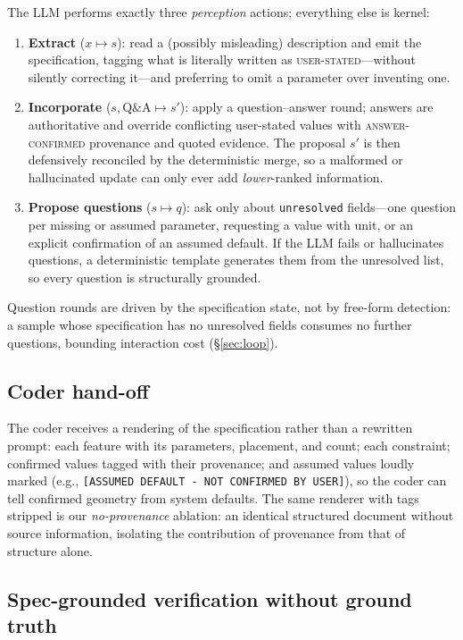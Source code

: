 The LLM performs exactly three \emph{perception} actions; everything else is
kernel:
\begin{enumerate}
  \item \textbf{Extract} ($x \mapsto s$): read a (possibly misleading)
  description and emit the specification, tagging what is literally written as
  \textsc{user-stated}---without silently correcting it---and preferring to
  omit a parameter over inventing one.
  \item \textbf{Incorporate} ($s, \mathrm{Q\&A} \mapsto s'$): apply a
  question--answer round; answers are authoritative and override conflicting
  user-stated values with \textsc{answer-confirmed} provenance and quoted
  evidence. The proposal $s'$ is then defensively reconciled by the
  deterministic merge, so a malformed or hallucinated update can only ever
  add \emph{lower}-ranked information.
  \item \textbf{Propose questions} ($s \mapsto q$): ask only about
  \texttt{unresolved} fields---one question per missing or assumed
  parameter, requesting a value with unit, or an explicit confirmation of an
  assumed default. If the LLM fails or hallucinates questions, a
  deterministic template generates them from the unresolved list, so every
  question is structurally grounded.
\end{enumerate}
Question rounds are driven by the specification state, not by free-form
detection: a sample whose specification has no unresolved fields consumes no
further questions, bounding interaction cost (\S\ref{sec:loop}).

\subsection{Coder hand-off}\label{sec:handoff}

The coder receives a rendering of the specification rather than a rewritten
prompt: each feature with its parameters, placement, and count; each
constraint; confirmed values tagged with their provenance; and assumed
values loudly marked (e.g., \texttt{[ASSUMED DEFAULT - NOT CONFIRMED BY
USER]}), so the coder can tell confirmed geometry from system defaults. The
same renderer with tags stripped is our \emph{no-provenance} ablation: an
identical structured document without source information, isolating the
contribution of provenance from that of structure alone.

\subsection{Spec-grounded verification without ground truth}
\label{sec:verifier}

